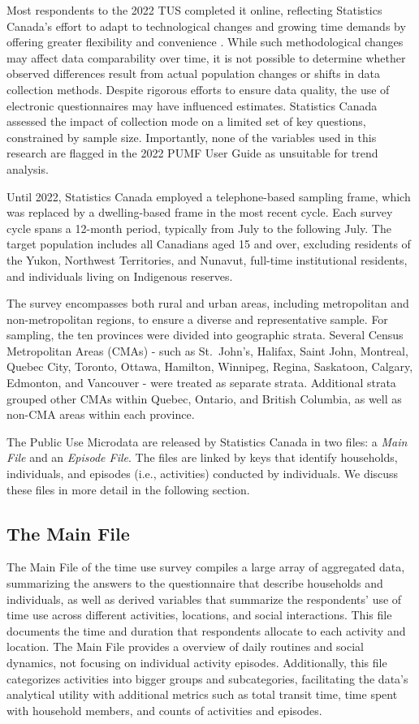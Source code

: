 \documentclass[Royal,times,sageh]{sagej}
\begin{document}
Most respondents to the 2022 TUS completed it online, reflecting
Statistics Canada's effort to adapt to technological changes and growing
time demands by offering greater flexibility and convenience
\citeyearpar{statisticscanada2022}. While such methodological changes
may affect data comparability over time, it is not possible to determine
whether observed differences result from actual population changes or
shifts in data collection methods. Despite rigorous efforts to ensure
data quality, the use of electronic questionnaires may have influenced
estimates. Statistics Canada assessed the impact of collection mode on a
limited set of key questions, constrained by sample size. Importantly,
none of the variables used in this research are flagged in the 2022 PUMF
User Guide as unsuitable for trend analysis.

Until 2022, Statistics Canada employed a telephone-based sampling frame,
which was replaced by a dwelling-based frame in the most recent cycle.
Each survey cycle spans a 12-month period, typically from July to the
following July. The target population includes all Canadians aged 15 and
over, excluding residents of the Yukon, Northwest Territories, and
Nunavut, full-time institutional residents, and individuals living on
Indigenous reserves.

The survey encompasses both rural and urban areas, including
metropolitan and non-metropolitan regions, to ensure a diverse and
representative sample. For sampling, the ten provinces were divided into
geographic strata. Several Census Metropolitan Areas (CMAs) - such as
St.~John's, Halifax, Saint John, Montreal, Quebec City, Toronto, Ottawa,
Hamilton, Winnipeg, Regina, Saskatoon, Calgary, Edmonton, and Vancouver
- were treated as separate strata. Additional strata grouped other CMAs
within Quebec, Ontario, and British Columbia, as well as non-CMA areas
within each province.

The Public Use Microdata are released by Statistics Canada in two files:
a \emph{Main File} and an \emph{Episode File}. The files are linked by
keys that identify households, individuals, and episodes (i.e.,
activities) conducted by individuals. We discuss these files in more
detail in the following section.

\subsection{The Main File}\label{the-main-file}

The Main File of the time use survey compiles a large array of
aggregated data, summarizing the answers to the questionnaire that
describe households and individuals, as well as derived variables that
summarize the respondents' use of time use across different activities,
locations, and social interactions. This file documents the time and
duration that respondents allocate to each activity and location. The
Main File provides a overview of daily routines and social dynamics, not
focusing on individual activity episodes. Additionally, this file
categorizes activities into bigger groups and subcategories,
facilitating the data's analytical utility with additional metrics such
as total transit time, time spent with household members, and counts of
activities and episodes.
\end{document}
